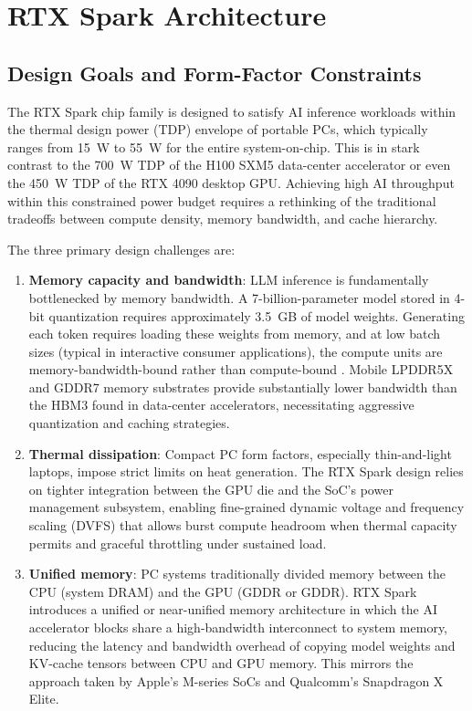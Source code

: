 \documentclass[conference]{IEEEtran}
\begin{document}
\section{RTX Spark Architecture}
\label{sec:architecture}

\subsection{Design Goals and Form-Factor Constraints}

The RTX Spark chip family is designed to satisfy AI inference workloads within the thermal design power (TDP) envelope of portable PCs, which typically ranges from 15~W to 55~W for the entire system-on-chip. This is in stark contrast to the 700~W TDP of the H100 SXM5 data-center accelerator or even the 450~W TDP of the RTX 4090 desktop GPU. Achieving high AI throughput within this constrained power budget requires a rethinking of the traditional tradeoffs between compute density, memory bandwidth, and cache hierarchy.

The three primary design challenges are:

\begin{enumerate}
    \item \textbf{Memory capacity and bandwidth}: LLM inference is fundamentally bottlenecked by memory bandwidth. A 7-billion-parameter model stored in 4-bit quantization requires approximately 3.5~GB of model weights. Generating each token requires loading these weights from memory, and at low batch sizes (typical in interactive consumer applications), the compute units are memory-bandwidth-bound rather than compute-bound \cite{sheng2023flexgen}. Mobile LPDDR5X and GDDR7 memory substrates provide substantially lower bandwidth than the HBM3 found in data-center accelerators, necessitating aggressive quantization and caching strategies.

    \item \textbf{Thermal dissipation}: Compact PC form factors, especially thin-and-light laptops, impose strict limits on heat generation. The RTX Spark design relies on tighter integration between the GPU die and the SoC's power management subsystem, enabling fine-grained dynamic voltage and frequency scaling (DVFS) that allows burst compute headroom when thermal capacity permits and graceful throttling under sustained load.

    \item \textbf{Unified memory}: PC systems traditionally divided memory between the CPU (system DRAM) and the GPU (GDDR or GDDR). RTX Spark introduces a unified or near-unified memory architecture in which the AI accelerator blocks share a high-bandwidth interconnect to system memory, reducing the latency and bandwidth overhead of copying model weights and KV-cache tensors between CPU and GPU memory. This mirrors the approach taken by Apple's M-series SoCs and Qualcomm's Snapdragon X Elite.
\end{enumerate}
\end{document}
